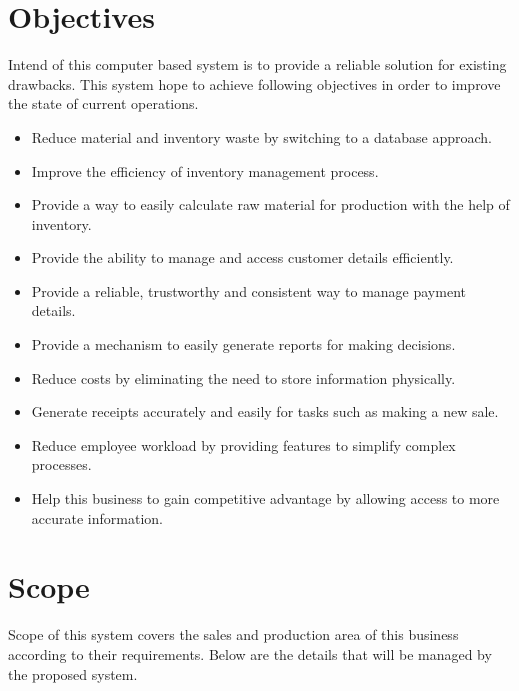 \documentclass[12pt]{report}
\begin{document}
\section{Objectives}

Intend of this computer based system is to provide a reliable solution for existing drawbacks.  This system hope to achieve following objectives in order to improve the state of current operations.

\begin{itemize}
	\item Reduce material and inventory waste by switching to a database approach.

	\item Improve the efficiency of inventory management process.

	\item Provide a way to easily calculate raw material for production with the help of inventory.

	\item Provide the ability to manage and access customer details efficiently.

	\item Provide a reliable,  trustworthy and consistent way to manage payment details.

	\item Provide a mechanism to easily generate reports for making decisions.

	\item Reduce costs by eliminating the need to store information physically.

	\item Generate receipts accurately and easily for tasks such as making a new sale.

	\item Reduce employee workload by providing features to simplify complex processes.

	\item Help this business to gain competitive advantage by allowing access to more accurate information.
\end{itemize}

\section{Scope}
Scope of this system covers the sales and production area of this business according to their requirements. Below are the details that will be managed by the proposed system.
\end{document}
